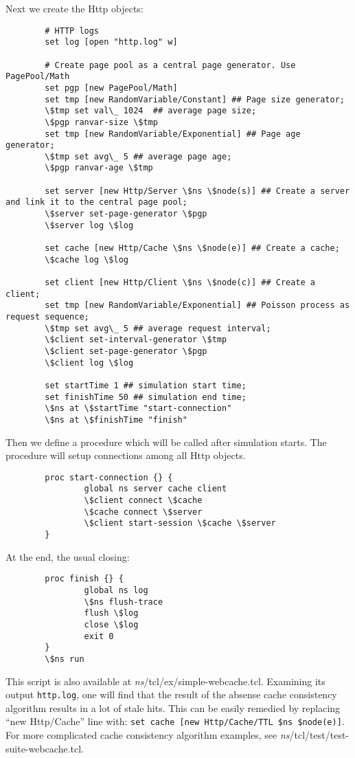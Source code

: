 Next we create the Http objects:

\begin{verbatim}
        # HTTP logs
        set log [open "http.log" w]

        # Create page pool as a central page generator. Use PagePool/Math
        set pgp [new PagePool/Math]
        set tmp [new RandomVariable/Constant] ## Page size generator;
        \$tmp set val\_ 1024  ## average page size;
        \$pgp ranvar-size \$tmp
        set tmp [new RandomVariable/Exponential] ## Page age generator;
        \$tmp set avg\_ 5 ## average page age;
        \$pgp ranvar-age \$tmp

        set server [new Http/Server \$ns \$node(s)] ## Create a server and link it to the central page pool;
        \$server set-page-generator \$pgp
        \$server log \$log

        set cache [new Http/Cache \$ns \$node(e)] ## Create a cache;
        \$cache log \$log

        set client [new Http/Client \$ns \$node(c)] ## Create a client;
        set tmp [new RandomVariable/Exponential] ## Poisson process as request sequence;
        \$tmp set avg\_ 5 ## average request interval;
        \$client set-interval-generator \$tmp
        \$client set-page-generator \$pgp
        \$client log \$log

        set startTime 1 ## simulation start time;
        set finishTime 50 ## simulation end time;
        \$ns at \$startTime "start-connection"
        \$ns at \$finishTime "finish"
\end{verbatim} %

Then we define a procedure which will be called after simulation
starts.  The procedure will setup connections among all Http objects.
\begin{verbatim}
        proc start-connection {} {
                global ns server cache client
                \$client connect \$cache
                \$cache connect \$server
                \$client start-session \$cache \$server
        }
\end{verbatim} %

At the end, the usual closing:
\begin{verbatim}
        proc finish {} {
                global ns log
                \$ns flush-trace
                flush \$log
                close \$log
                exit 0
        }
        \$ns run
\end{verbatim}

This script is also available at \emph{ns}/tcl/ex/simple-webcache.tcl. 
Examining its output {\tt http.log}, one will find that the result of 
the absense cache consistency algorithm results in a lot of stale hits. 
This can be easily remedied by replacing ``new Http/Cache'' line with:
{\tt set cache [new Http/Cache/TTL \$ns \$node(e)]}. For more complicated
cache consistency algorithm examples, see 
\emph{ns}/tcl/test/test-suite-webcache.tcl.

